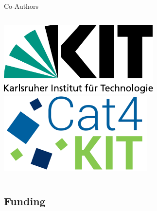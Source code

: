 \begin{frame}{Co-Authors}
\begin{columns}[T]
		\begin{column}{0.3\linewidth}
			\centering
			\href{https://kit.edu}{
				\includegraphics[width=0.5\linewidth]{figures/kit.pdf}
			 } \\
			 \vspace{1em}
			 \href{https://kit.edu}{
				 \includegraphics[width=0.5\linewidth]{figures/cat4kit.png}
			  }
		\end{column}
	\end{columns}

\end{frame}

\subsection*{Funding} \label{sec:funding}

